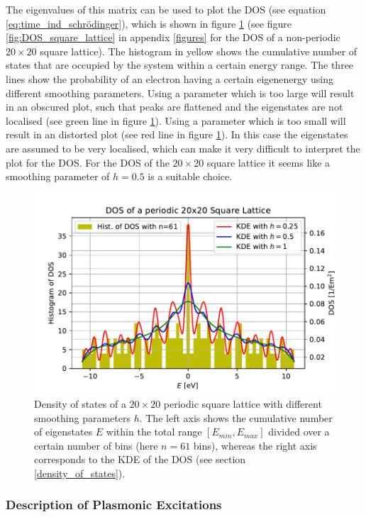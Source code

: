 The eigenvalues of this matrix can be used to plot the DOS (see equation \ref{eq:time_ind_schrödinger}), which is shown in figure \ref{fig:DOS_square_lattice_per} (see figure \ref{fig:DOS_square_lattice} in appendix \ref{figures} for the DOS of a non-periodic $20\times 20$ square lattice). The histogram in yellow shows the cumulative number of states that are occupied by the system within a certain energy range. The three lines show the probability of an electron having a certain eigenenergy using different smoothing parameters. Using a parameter which is too large will result in an obscured plot, such that peaks are flattened and the eigenstates are not localised (see green line in figure \ref{fig:DOS_square_lattice_per}). Using a parameter which is too small will result in an distorted plot (see red line in figure \ref{fig:DOS_square_lattice_per}). In this case the eigenstates are assumed to be very localised, which can make it very difficult to interpret the plot for the DOS. For the DOS of the $20\times 20$ square lattice it seems like a smoothing parameter of $h=0.5$ is a suitable choice.

\begin{figure}[H]
    \centering
    \includegraphics[width=.7\textwidth]{img/DOS_20x20_square_lattice_per.pdf}
    \caption{Density of states of a $20\times 20$ periodic square lattice with different smoothing parameters $h$. The left axis shows the cumulative number of eigenstates $E$ within the total range $[E_{min},E_{max}]$ divided over a certain number of bins (here $n=61$ bins), whereas the right axis corresponds to the KDE of the DOS (see section \ref{density_of_states}).}
    \label{fig:DOS_square_lattice_per}
\end{figure}

\subsubsection{Description of Plasmonic Excitations}

